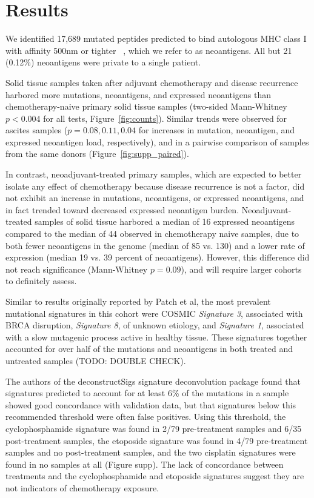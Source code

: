 \section*{Results}


We identified 17,689 mutated peptides predicted to bind autologous MHC class I with affinity 500nm or tighter ~\cite{Sette1994}, which we refer to as neoantigens. All but 21 (0.12\%) neoantigens were private to a single patient.

Solid tissue samples taken after adjuvant chemotherapy and disease recurrence harbored more mutations, neoantigens, and expressed neoantigens than chemotherapy-naive primary solid tissue samples (two-sided Mann-Whitney $p < 0.004$ for all tests, Figure~\ref{fig:counts}). Similar trends were observed for ascites samples ($p = 0.08, 0.11, 0.04$ for increases in mutation, neoantigen, and expressed neoantigen load, respectively), and in a pairwise comparison of samples from the same donors (Figure~\ref{fig:supp_paired}).

In contrast, neoadjuvant-treated primary samples, which are expected to better isolate any effect of chemotherapy because disease recurrence is not a factor, did not exhibit an increase in mutations, neoantigens, or expressed neoantigens, and in fact trended toward decreased expressed neoantigen burden. Neoadjuvant-treated samples of solid tissue harbored a median of 16 expressed neoantigens compared to the median of 44 observed in chemotherapy naive samples, due to both fewer neoantigens in the genome (median of 85 vs. 130) and a lower rate of expression (median 19 vs. 39 percent of neoantigens). However, this difference did not reach significance (Mann-Whitney $p=0.09$), and will require larger cohorts to definitely assess.

Similar to results originally reported by Patch et al, the most prevalent mutational signatures in this cohort were COSMIC \textit{Signature 3}, associated with BRCA disruption, \textit{Signature 8}, of unknown etiology, and \textit{Signature 1}, associated with a slow mutagenic process active in healthy tissue. These signatures together accounted for over half of the mutations and neoantigens in both treated and untreated samples (TODO: DOUBLE CHECK).

The authors of the deconstructSigs signature deconvolution package found that signatures predicted to account for at least 6\% of the mutations in a sample showed good concordance with validation data, but that signatures below this recommended threshold were often false positives. Using this threshold, the cyclophosphamide signature was found in 2/79 pre-treatment samples and 6/35 post-treatment samples, the etoposide signature was found in 4/79 pre-treatment samples and no post-treatment samples, and the two cisplatin signatures were found in no samples at all (Figure supp). The lack of concordance between treatments and the cyclophosphamide and etoposide signatures suggest they are not indicators of chemotherapy exposure.

